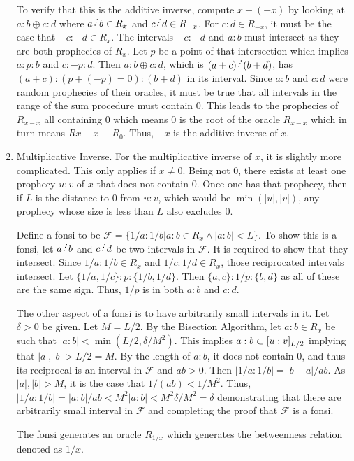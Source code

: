 \documentclass[12pt]{article}
\begin{document}
\begin{enumerate}
    To verify that this is the additive inverse, compute $x + (-x)$ by looking at $a:b \oplus c:d$ where $a \lte b \in R_x$ and $c \lte d \in R_{-x}$. For $c:d \in R_{-x}$, it must be the case that $-c:-d \in R_x$. The intervals $-c : -d$ and $a:b$ must intersect as they are both prophecies of $R_x$. Let $p$ be a point of that intersection which implies $a:p:b$ and $c:-p:d$. Then $a:b \oplus c:d$, which is $(a+c) \lte (b+d)$, has $(a+c) : ( p + (-p) =0 ) : (b+d)$ in its interval. Since $a:b$ and $c:d$ were random prophecies of their oracles, it must be true that all intervals in the range of the sum procedure must contain 0. This leads to the prophecies of $R_{x-x}$ all containing 0 which means 0 is the root of the oracle $R_{x-x}$ which in turn means $R{x-x} \equiv R_0$.  Thus, $-x$ is the additive inverse of $x$. 
    
    \item Multiplicative Inverse. For the multiplicative inverse of $x$, it is slightly more complicated. This only applies if $x \neq 0$. Being not 0, there exists at least one prophecy $u:v$ of $x$ that does not contain 0. Once one has that prophecy, then if $L$ is the distance to 0 from $u:v$, which would be $\min(|u|, |v|)$, any prophecy whose size is less than $L$ also excludes 0. 
    
    Define a fonsi to be $\mathcal{F} = \{1/a : 1/b | a:b \in R_x \wedge |a:b| < L \}$. To show this is a fonsi, let $a\lte b$ and $c \lte d$ be two intervals in $\mathcal{F}$. It is required to show that they intersect. Since $1/a:1/b \in R_x$ and $1/c:1/d \in R_x$, those reciprocated intervals intersect. Let $\{1/a, 1/c\} : p : \{1/b, 1/d\}$. Then $\{a, c\} : 1/p : \{b, d\}$ as all of these are the same sign. Thus, $1/p$ is in both $a:b$ and $c:d$. 

    The other aspect of a fonsi is to have arbitrarily small intervals in it. Let $\delta > 0$ be given. Let $M = L/2$. By the Bisection Algorithm, let $a:b \in R_x$ be such that $|a:b| < \min(L/2, \delta/M^2)$. This implies $a:b \subset \halo[L/2]{u:v}$ implying that $|a|, |b| >  L/2 = M$. By the length of $a:b$, it does not contain 0, and thus its reciprocal is an interval in $\mathcal{F}$ and $ab > 0$. Then $|1/a: 1/b| = |b-a|/ab$. As $|a|, |b| > M$, it is the case that $1/(ab) < 1/M^2$. Thus, $|1/a:1/b| = |a:b|/ab < M^2|a:b| < M^2 \delta/M^2 = \delta$ demonstrating that there are arbitrarily small interval in $\mathcal{F}$ and completing the proof that $\mathcal{F}$ is a fonsi. 
    
    The fonsi generates an oracle $R_{1/x}$ which generates the betweenness relation denoted as $1/x$. 


\end{enumerate}
\end{document}

